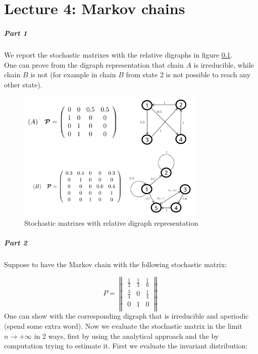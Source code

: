 \chapter*{Lecture 4: Markov chains}

\paragraph{Part 1} We report the stochastic matrixes with the relative digraphs in figure \ref{chapter4:part1}. \\
One can prove from the digraph representation that chain $A$ is irreducible, while chain $B$ is not (for example in chain $B$ from state 2 
is not possible to reach any other state).

\begin{figure}[H]
    \centering
    \includegraphics[width=0.8\textwidth]{FIG/exercise_4_images/Exercise 4_part1.png}
    \caption{Stochastic matrixes with relative digraph representation}
    \label{chapter4:part1}
\end{figure}

\paragraph*{Part 2}

Suppose to have the Markov chain with the following stochastic matrix:

$$ P =
\begin{Vmatrix} 
\frac{1}{2} & \frac{1}{3} & \frac{1}{6} \\
\frac{3}{4} & 0 & \frac{1}{4} \\
0 & 1 & 0 \\
\end{Vmatrix}
$$
One can show with the corresponding digraph that is irreducible and aperiodic (spend some extra word).
Now we evaluate the stochastic matrix in the limit $n \to +\infty$ in 2 ways, first by using the analytical approach and the by computation trying to estimate it.
First we evaluate the invariant distribution:

